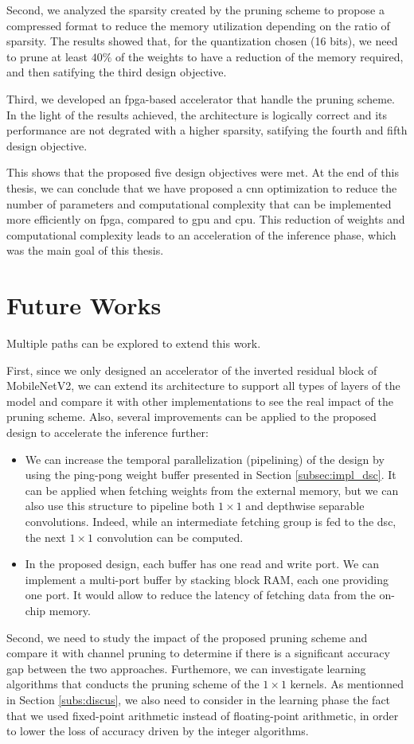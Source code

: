 Second, we analyzed the sparsity created by the pruning scheme to propose a compressed format to reduce the memory utilization depending on the ratio of sparsity. The results showed that, for the quantization chosen (16 bits), we need to prune at least $40 \%$ of the weights to have a reduction of the memory required, and then satifying the third design objective. 

Third, we developed an \acrshort{fpga}-based accelerator that handle the pruning scheme. In the light of the results achieved, the architecture is logically correct and its performance are not degrated with a higher sparsity, satifying the fourth and fifth design objective.

This shows that the proposed five design objectives were met. At the end of this thesis, we can conclude that we have proposed a \acrshort{cnn} optimization to reduce the number of parameters and computational complexity that can be implemented more efficiently on \acrshort{fpga}, compared to \acrshort{gpu} and \acrshort{cpu}. This reduction of weights and computational complexity leads to an acceleration of the inference phase, which was the main goal of this thesis.
%
\section*{Future Works}
%
Multiple paths can be explored to extend this work.

First, since we only designed an accelerator of the inverted residual block of MobileNetV2, we can extend its architecture to support all types of layers of the model and compare it with other implementations to see the real impact of the pruning scheme. Also, several improvements can be applied to the proposed design to accelerate the inference further:
%
\begin{itemize}
    \item We can increase the temporal parallelization (pipelining) of the design by using the ping-pong weight buffer presented in Section \ref{subsec:impl_dsc}. It can be applied when fetching weights from the external memory, but we can also use this structure to pipeline both $1 \times 1$ and depthwise separable convolutions. Indeed, while an intermediate fetching group is fed to the \acrshort{dsc}, the next $1 \times 1$ convolution can be computed. 
    \item In the proposed design, each buffer has one read and write port. We can implement a multi-port buffer by stacking block RAM, each one providing one port. It would allow to reduce the latency of fetching data from the on-chip memory.
\end{itemize}
%
Second, we need to study the impact of the proposed pruning scheme and compare it with channel pruning to determine if there is a significant accuracy gap between the two approaches. Furthemore, we can investigate learning algorithms that conducts the pruning scheme of the $1 \times 1$ kernels. As mentionned in Section \ref{subs:discus}, we also need to consider in the learning phase the fact that we used fixed-point arithmetic instead of floating-point arithmetic, in order to lower the loss of accuracy driven by the integer algorithms.

